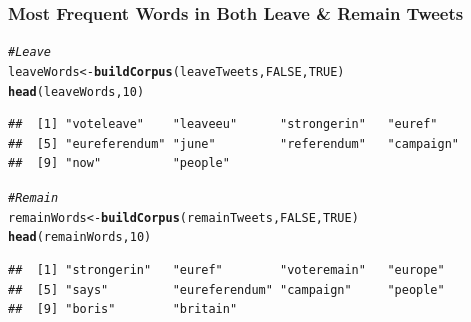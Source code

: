 \documentclass[10pt  ,usenames, dvipsnames]{article}\usepackage[]{graphicx}\usepackage[]{color}
\makeatletter
\newcommand{\hlnum}[1]{\textcolor[rgb]{0.686,0.059,0.569}{#1}}%
\newcommand{\hlcom}[1]{\textcolor[rgb]{0.678,0.584,0.686}{\textit{#1}}}%
\newcommand{\hlstd}[1]{\textcolor[rgb]{0.345,0.345,0.345}{#1}}%
\newcommand{\hlkwb}[1]{\textcolor[rgb]{0.69,0.353,0.396}{#1}}%
\newcommand{\hlkwd}[1]{\textcolor[rgb]{0.737,0.353,0.396}{\textbf{#1}}}%
\newenvironment{kframe}{%
 \def\at@end@of@kframe{}%
 \ifinner\ifhmode%
  \def\at@end@of@kframe{\end{minipage}}%
  \begin{minipage}{\columnwidth}%
 \fi\fi%
 \def\FrameCommand##1{\hskip\@totalleftmargin \hskip-\fboxsep
 \colorbox{shadecolor}{##1}\hskip-\fboxsep
     \hskip-\linewidth \hskip-\@totalleftmargin \hskip\columnwidth}%
 \MakeFramed {\advance\hsize-\width
   \@totalleftmargin\z@ \linewidth\hsize
   \@setminipage}}%
 {\par\unskip\endMakeFramed%
 \at@end@of@kframe}
\newenvironment{knitrout}{}{} %
\makeatother
\begin{document}
% 




\subsubsection{Most Frequent Words in Both Leave \& Remain Tweets}

\begin{knitrout}
\color{fgcolor}\begin{kframe}
\begin{alltt}
\hlcom{#Leave}
\hlstd{leaveWords} \hlkwb{<-} \hlkwd{buildCorpus}\hlstd{(leaveTweets,} \hlnum{FALSE}\hlstd{,}\hlnum{TRUE}\hlstd{)}
\hlkwd{head}\hlstd{(leaveWords,} \hlnum{10}\hlstd{)}
\end{alltt}
\end{kframe}
\end{knitrout}

\begin{knitrout}
\color{fgcolor}\begin{kframe}
\begin{verbatim}
##  [1] "voteleave"    "leaveeu"      "strongerin"   "euref"       
##  [5] "eureferendum" "june"         "referendum"   "campaign"    
##  [9] "now"          "people"
\end{verbatim}
\end{kframe}
\end{knitrout}


\begin{knitrout}
\color{fgcolor}\begin{kframe}
\begin{alltt}
\hlcom{#Remain}
\hlstd{remainWords} \hlkwb{<-} \hlkwd{buildCorpus}\hlstd{(remainTweets,} \hlnum{FALSE}\hlstd{,}\hlnum{TRUE}\hlstd{)}
\hlkwd{head}\hlstd{(remainWords,} \hlnum{10}\hlstd{)}
\end{alltt}
\end{kframe}
\end{knitrout}

\begin{knitrout}
\color{fgcolor}\begin{kframe}
\begin{verbatim}
##  [1] "strongerin"   "euref"        "voteremain"   "europe"      
##  [5] "says"         "eureferendum" "campaign"     "people"      
##  [9] "boris"        "britain"
\end{verbatim}
\end{kframe}
\end{knitrout}
\end{document}
